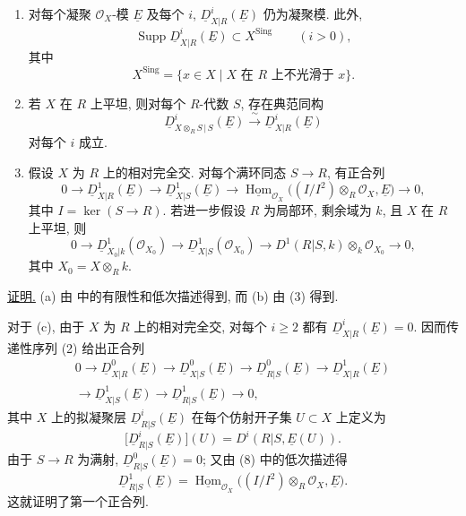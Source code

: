 \begin{enumerate}[label=(\alph*)]
\item 对每个凝聚 $\mathcal O_X$-模 $\underline E$ 及每个 $i$, $\underline D^i_{X|R}(\underline E)$ 仍为凝聚模. 此外,
\[
 \operatorname{Supp}\underline D^i_{X|R}(\underline E)
 \subset X^{\mathrm{Sing}}
 \qquad(i>0),
\]
其中
\[
 X^{\mathrm{Sing}}
 =\{x\in X\mid X\text{ 在 }R\text{ 上不光滑于 }x\}.
\]

\item 若 $X$ 在 $R$ 上平坦, 则对每个 $R$-代数 $S$, 存在典范同构
\[
 \underline D^i_{X\otimes_RS\,|\,S}(\underline E)
 \xrightarrow{\ \sim\ }
 \underline D^i_{X|R}(\underline E)
\]
对每个 $i$ 成立.

\item 假设 $X$ 为 $R$ 上的相对完全交. 对每个满环同态 $S\longrightarrow R$, 有正合列
\[
0\longrightarrow\underline D^1_{X|R}(\underline E)
\longrightarrow\underline D^1_{X|S}(\underline E)
\longrightarrow
\underline{\operatorname{Hom}}_{\mathcal O_X}
 \bigl((I/I^2)\otimes_R\mathcal O_X,\underline E\bigr)
\longrightarrow0,
\]
其中 $I=\ker(S\longrightarrow R)$. 若进一步假设 $R$ 为局部环, 剩余域为 $k$, 且 $X$ 在 $R$ 上平坦, 则
\[
0\longrightarrow
 \underline D^1_{X_0|k}(\mathcal O_{X_0})
\longrightarrow
 \underline D^1_{X|S}(\mathcal O_{X_0})
\longrightarrow
 D^1(R|S,k)\otimes_k\mathcal O_{X_0}
\longrightarrow0,
\]
其中 $X_0=X\otimes_Rk$.
\end{enumerate}

\underline{证明.}
(a) 由  中的有限性和低次描述得到, 而 (b) 由 (3) 得到.

对于 (c), 由于 $X$ 为 $R$ 上的相对完全交, 对每个 $i\geq2$ 都有 $\underline D^i_{X|R}(\underline E)=0$. 因而传递性序列 (2) 给出正合列
\begin{multline*}
0\longrightarrow\underline D^0_{X|R}(\underline E)
\longrightarrow\underline D^0_{X|S}(\underline E)
\longrightarrow\underline D^0_{R|S}(\underline E)
\longrightarrow\underline D^1_{X|R}(\underline E)\\
\longrightarrow\underline D^1_{X|S}(\underline E)
\longrightarrow\underline D^1_{R|S}(\underline E)
\longrightarrow0,
\end{multline*}
其中 $X$ 上的拟凝聚层 $\underline D^i_{R|S}(\underline E)$ 在每个仿射开子集 $U\subset X$ 上定义为
\[
 \bigl[\underline D^i_{R|S}(\underline E)\bigr](U)
 =D^i(R|S,\underline E(U)).
\]
由于 $S\longrightarrow R$ 为满射, $\underline D^0_{R|S}(\underline E)=0$; 又由 (8) 中的低次描述得
\[
 \underline D^1_{R|S}(\underline E)
 =\underline{\operatorname{Hom}}_{\mathcal O_X}
  \bigl((I/I^2)\otimes_R\mathcal O_X,\underline E\bigr).
\]
这就证明了第一个正合列.

